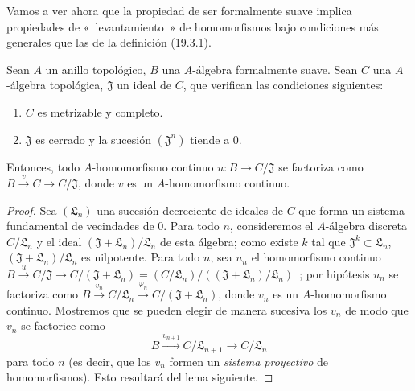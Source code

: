 \begin{env}[19.3.9]
\label{0.19.3.9-fr}
Vamos a ver ahora que la propiedad de ser formalmente suave
implica propiedades de «~levantamiento~» de homomorfismos bajo condiciones
más generales que las de la definición (19.3.1).
\end{env}


\begin{proposition}[19.3.10]
\label{0.19.3.10-fr}
Sean $A$ un anillo topológico, $B$ una $A$-álgebra formalmente suave.
Sean $C$ una $A$-álgebra topológica, $\mathfrak J$ un ideal de $C$,
que verifican las condiciones siguientes:
\begin{enumerate}
  \item[$1^\circ$] $C$ es metrizable y completo.
  \item[$2^\circ$] $\mathfrak J$ es cerrado y la sucesión
  $(\mathfrak J^n)$ tiende a $0$.
\end{enumerate}
Entonces, todo $A$-homomorfismo continuo $u:B\to C/\mathfrak J$ se factoriza como
$B\xrightarrow{v}C\to C/\mathfrak J$, donde $v$ es un
$A$-homomorfismo continuo.
\end{proposition}

\begin{proof}
Sea $(\mathfrak L_n)$ una sucesión decreciente de ideales de $C$ que forma un
sistema fundamental de vecindades de $0$. Para todo $n$, consideremos el
$A$-álgebra discreta $C/\mathfrak L_n$ y el ideal
$(\mathfrak J+\mathfrak L_n)/\mathfrak L_n$ de esta álgebra; como
existe $k$ tal que $\mathfrak J^k\subset\mathfrak L_n$,
$(\mathfrak J+\mathfrak L_n)/\mathfrak L_n$ es nilpotente. Para todo
$n$, sea $u_n$ el homomorfismo continuo
$B\xrightarrow{u}C/\mathfrak J\to C/(\mathfrak J+\mathfrak L_n)
=(C/\mathfrak L_n)/((\mathfrak J+\mathfrak L_n)/\mathfrak L_n)$~;
por hipótesis $u_n$ se factoriza como
$B\xrightarrow{v_n}C/\mathfrak L_n
\xrightarrow{\varphi_n}C/(\mathfrak J+\mathfrak L_n)$,
donde $v_n$ es un $A$-homomorfismo continuo. Mostremos que se pueden elegir de
manera sucesiva los $v_n$ de modo que $v_n$ se factorice como
\[
  B\xrightarrow{v_{n+1}}C/\mathfrak L_{n+1}\to C/\mathfrak L_n
\]
para todo $n$ (es decir, que los $v_n$ formen un \emph{sistema
proyectivo} de homomorfismos). Esto resultará del lema siguiente.
\end{proof}

